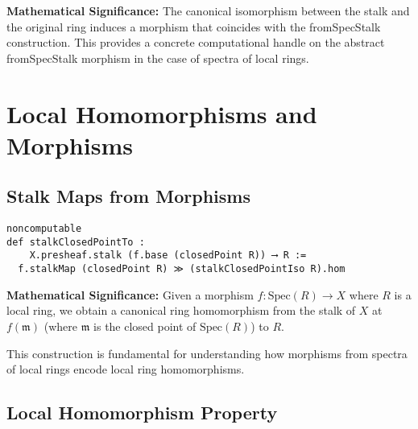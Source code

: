 \documentclass{article}
\theoremstyle{definition}
\begin{document}
\textbf{Mathematical Significance:} The canonical isomorphism between the stalk and the original ring induces a morphism that coincides with the fromSpecStalk construction. This provides a concrete computational handle on the abstract fromSpecStalk morphism in the case of spectra of local rings.

\section{Local Homomorphisms and Morphisms}

\subsection{Stalk Maps from Morphisms}

\begin{lstlisting}
noncomputable
def stalkClosedPointTo :
    X.presheaf.stalk (f.base (closedPoint R)) ⟶ R :=
  f.stalkMap (closedPoint R) ≫ (stalkClosedPointIso R).hom
\end{lstlisting}

\textbf{Mathematical Significance:} Given a morphism $f: \mathrm{Spec}(R) \to X$ where $R$ is a local ring, we obtain a canonical ring homomorphism from the stalk of $X$ at $f(\mathfrak{m})$ (where $\mathfrak{m}$ is the closed point of $\mathrm{Spec}(R)$) to $R$.

This construction is fundamental for understanding how morphisms from spectra of local rings encode local ring homomorphisms.

\subsection{Local Homomorphism Property}
\end{document}
